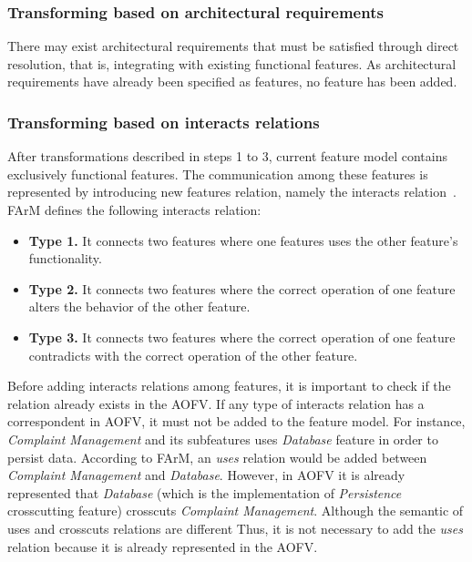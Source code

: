 \documentclass[11pt,twoside]{article}
\begin{document}
\subsubsection{Transforming based on architectural requirements}
\label{sec:transfArchReq}

There may exist architectural requirements that must be satisfied through direct resolution, that is, integrating with existing functional
features. As architectural requirements have already been specified as features, no feature has been added.

\subsubsection{Transforming based on interacts relations}
\label{sec:transInteracts}
After transformations described in steps 1 to 3, current feature model contains exclusively functional features. The communication among
these features is represented by introducing new features relation, namely the interacts relation~\cite{Sochos:2006:FAM}. FArM
defines the following interacts relation:

\begin{itemize}
\item \textbf{Type 1.} It connects two features where one features uses the other feature's functionality.
\item \textbf{Type 2.} It connects two features where the correct operation of one feature alters the behavior of the other feature.
\item \textbf{Type 3.} It connects two features where the correct operation of one feature contradicts with the correct operation of the
other feature.
\end{itemize}

Before adding interacts relations among features, it is important to check if the relation already exists in the AOFV. If any type of
interacts relation has a correspondent in AOFV, it must not be added to the feature model. For instance, \textit{Complaint Management} and
its subfeatures uses \textit{Database} feature in order to persist data. According to FArM, an \textit{uses} relation would be added between
\textit{Complaint Management} and \textit{Database}. However, in AOFV it is already represented that \textit{Database} (which is the
implementation of \textit{Persistence} crosscutting feature) crosscuts \textit{Complaint Management}. Although the semantic of uses and
crosscuts relations are different Thus, it is not necessary to add the \textit{uses} relation because it is already represented
in the AOFV. 
\end{document}
